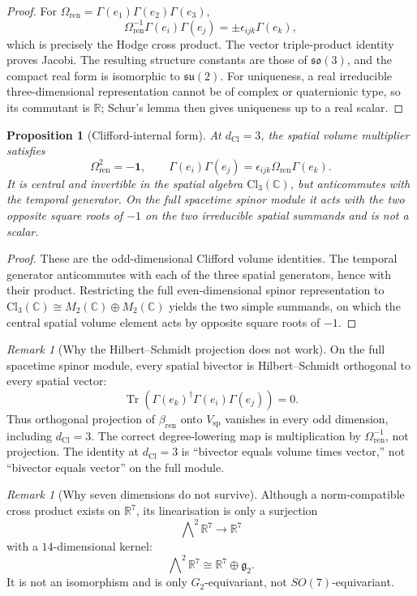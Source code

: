 \documentclass[11pt]{article}
\newtheorem{proposition}[theorem]{Proposition}
\theoremstyle{definition}
\theoremstyle{remark}
\newtheorem{remark}[theorem]{Remark}
\newcommand{\R}{\mathbb{R}}
\newcommand{\C}{\mathbb{C}}
\newcommand{\Cl}{\mathrm{Cl}}
\newcommand{\dCl}{d_{\mathrm{Cl}}}
\newcommand{\Tr}{\operatorname{Tr}}
\newcommand{\one}{\mathbf{1}}
\newcommand{\Vsp}{V_{\mathrm{sp}}}
\newcommand{\Volr}{\Omega_{\mathrm{ren}}}
\newcommand{\bren}{\beta_{\mathrm{ren}}}
\begin{document}
\begin{proof}
For \(\Volr=\Gamma(e_1)\Gamma(e_2)\Gamma(e_3)\),
\[
  \Volr^{-1}\Gamma(e_i)\Gamma(e_j)=\pm\epsilon_{ijk}\Gamma(e_k),
\]
which is precisely the Hodge cross product. The vector triple-product identity
proves Jacobi. The resulting structure constants are those of
\(\mathfrak{so}(3)\), and the compact real form is isomorphic to
\(\mathfrak{su}(2)\). For uniqueness, a real irreducible three-dimensional
representation cannot be of complex or quaternionic type, so its commutant is
\(\R\); Schur's lemma then gives uniqueness up to a real scalar.
\end{proof}

\begin{proposition}[Clifford-internal form]
\label{prop:clifford-internal-interference}
At \(\dCl=3\), the spatial volume multiplier satisfies
\[
  \Volr^2=-\one,
  \qquad
  \Gamma(e_i)\Gamma(e_j)
  =\epsilon_{ijk}\Volr\Gamma(e_k).
\]
It is central and invertible in the spatial algebra
\(\Cl_3(\C)\), but anticommutes with the temporal generator. On the full
spacetime spinor module it acts with the two opposite square roots of
\(-1\) on the two irreducible spatial summands and is not a scalar.
\end{proposition}

\begin{proof}
These are the odd-dimensional Clifford volume identities. The temporal
generator anticommutes with each of the three spatial generators, hence with
their product. Restricting the full even-dimensional spinor representation to
\(\Cl_3(\C)\cong M_2(\C)\oplus M_2(\C)\) yields the two simple summands, on which
the central spatial volume element acts by opposite square roots of \(-1\).
\end{proof}

\begin{remark}[Why the Hilbert--Schmidt projection does not work]
On the full spacetime spinor module, every spatial bivector is
Hilbert--Schmidt orthogonal to every spatial vector:
\[
  \Tr\!\left(\Gamma(e_k)^\dagger
  \Gamma(e_i)\Gamma(e_j)\right)=0.
\]
Thus orthogonal projection of \(\bren\) onto \(\Vsp\) vanishes in every odd
dimension, including \(\dCl=3\). The correct degree-lowering map is
multiplication by \(\Volr^{-1}\), not projection. The identity at
\(\dCl=3\) is ``bivector equals volume times vector,'' not ``bivector equals
vector'' on the full module.
\end{remark}

\begin{remark}[Why seven dimensions do not survive]
\label{rem:no-seven-dimensional-exception}
Although a norm-compatible cross product exists on \(\R^7\), its linearisation
is only a surjection
\[
  \bigwedge\nolimits^2\R^7\longrightarrow\R^7
\]
with a \(14\)-dimensional kernel:
\[
  \bigwedge\nolimits^2\R^7\cong\R^7\oplus\mathfrak g_2.
\]
It is not an isomorphism and is only \(G_2\)-equivariant, not
\(SO(7)\)-equivariant.
\end{remark}
\end{document}
